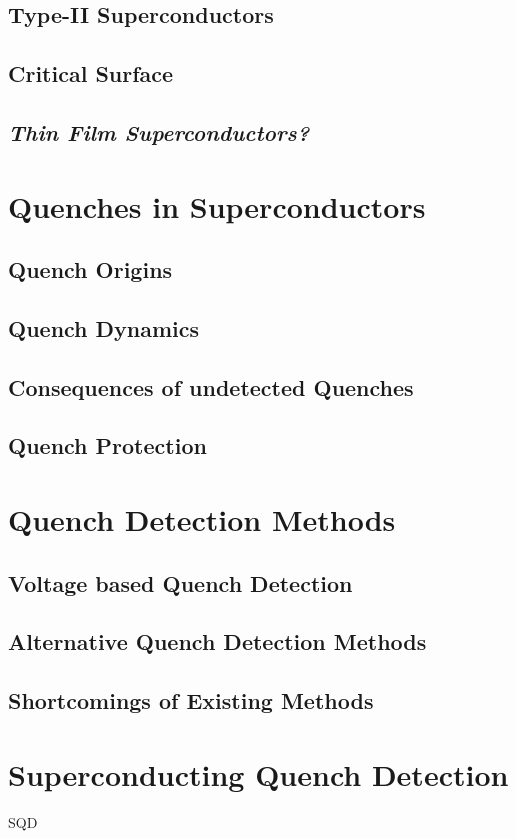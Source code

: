 \subsection{Type-II Superconductors}
\subsection{Critical Surface}

\subsection{\textit{Thin Film Superconductors?}}



\section{Quenches in Superconductors}
\subsection{Quench Origins}
\subsection{Quench Dynamics}
\subsection{Consequences of undetected Quenches}
\subsection{Quench Protection}

\section{Quench Detection Methods}
\subsection{Voltage based Quench Detection}
\subsection{Alternative Quench Detection Methods}
\subsection{Shortcomings of Existing Methods}

\section{Superconducting Quench Detection}
\ac{SQD}
